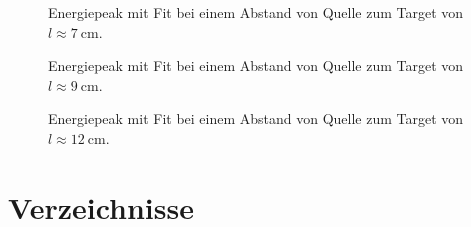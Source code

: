 \documentclass[slug=CS, room=Andreas-Schubert-Bau\,\ Labor\ 406,
supervisor=Juliane\ Volkmer, coursedate=29.\ 11.\ 2019]{../../Lab_Report_LaTeX/lab_report}
\begin{document}
\begin{figure}[H]\centering
  
  \caption{Energiepeak mit Fit bei einem Abstand von Quelle zum Target von \(l \approx \SI{7}{\centi\metre}\).}
  \label{fig:dists-7}
\end{figure}

\begin{figure}[H]\centering
  
  \caption{Energiepeak mit Fit bei einem Abstand von Quelle zum Target von \(l \approx \SI{9}{\centi\metre}\).}
  \label{fig:dists-9}
\end{figure}

\begin{figure}[H]\centering
  
  \caption{Energiepeak mit Fit bei einem Abstand von Quelle zum Target von \(l \approx \SI{12}{\centi\metre}\).}
  \label{fig:dists-12}
\end{figure}

\section{Verzeichnisse}

\label{sec:literatur}

\listoffigures

\listoftables

\printbibliography
\end{document}
